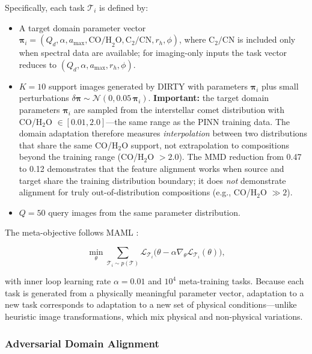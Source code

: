 \documentclass[usenatbib]{mnras}
\begin{document}
Specifically, each task $\mathcal{T}_i$ is defined by:
\begin{itemize}
    \item A target domain parameter vector $\boldsymbol{\pi}_i = (Q_d, \alpha, a_{\max}, \text{CO/H}_2\text{O}, \text{C}_2/\text{CN}, r_h, \phi)$, where $\text{C}_2/\text{CN}$ is included only when spectral data are available; for imaging-only inputs the task vector reduces to $(Q_d, \alpha, a_{\max}, r_h, \phi)$.
    \item $K=10$ support images generated by DIRTY with parameters $\boldsymbol{\pi}_i$ plus small perturbations $\delta\boldsymbol{\pi} \sim \mathcal{N}(0, 0.05\,\boldsymbol{\pi}_i)$. \textbf{Important:} the target domain parameters $\boldsymbol{\pi}_i$ are sampled from the interstellar comet distribution with CO/H$_2$O $\in [0.01, 2.0]$---the same range as the PINN training data. The domain adaptation therefore measures \textit{interpolation} between two distributions that share the same CO/H$_2$O support, not extrapolation to compositions beyond the training range (CO/H$_2$O $>2.0$). The MMD reduction from 0.47 to 0.12 demonstrates that the feature alignment works when source and target share the training distribution boundary; it does \textit{not} demonstrate alignment for truly out-of-distribution compositions (e.g., CO/H$_2$O $\gg 2$).
    \item $Q=50$ query images from the same parameter distribution.
\end{itemize}

The meta-objective follows MAML \citep{finn17}:

\begin{equation}\label{eq:maml}
\min_\theta \sum_{\mathcal{T}_i \sim p(\mathcal{T})}
\mathcal{L}_{\mathcal{T}_i}\bigl(\theta - \alpha \nabla_\theta \mathcal{L}_{\mathcal{T}_i}(\theta)\bigr),
\end{equation}

with inner loop learning rate $\alpha = 0.01$ and $10^4$ meta-training tasks. Because each task is generated from a physically meaningful parameter vector, adaptation to a new task corresponds to adaptation to a new set of physical conditions---unlike heuristic image transformations, which mix physical and non-physical variations.

\subsubsection{Adversarial Domain Alignment}
\end{document}
